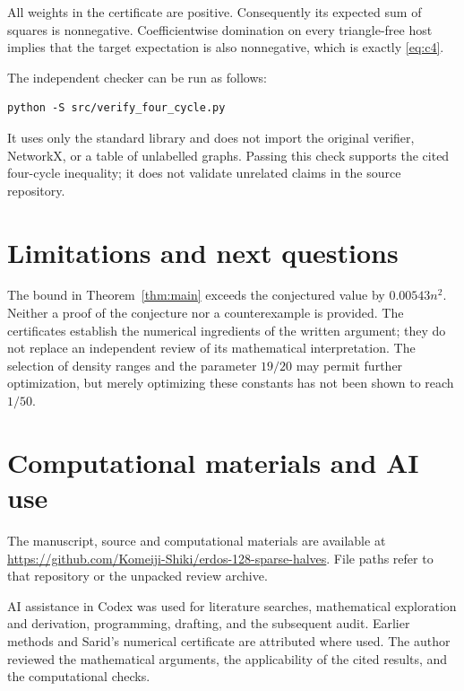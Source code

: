 \documentclass[12pt]{article}
\begin{document}
All weights in the certificate are positive. Consequently its expected
sum of squares is nonnegative. Coefficientwise domination on every
triangle-free host implies that the target expectation is also
nonnegative, which is exactly \eqref{eq:c4}.

The independent checker can be run as follows:
\begin{lstlisting}
python -S src/verify_four_cycle.py
\end{lstlisting}
It uses only the standard library and does not import the original
verifier, NetworkX, or a table of unlabelled graphs. Passing this check
supports the cited four-cycle inequality; it does not validate unrelated
claims in the source repository.

\section{Limitations and next questions}
The bound in Theorem~\ref{thm:main} exceeds the conjectured value by
$0.00543n^2$. Neither a proof of the conjecture nor a counterexample is
provided. The certificates establish the numerical ingredients of the
written argument; they do not replace an independent review of its
mathematical interpretation. The selection of density ranges and the
parameter $19/20$ may permit further optimization, but merely optimizing
these constants has not been shown to reach $1/50$.

\section*{Computational materials and AI use}
The manuscript, source and computational materials are available at
\url{https://github.com/Komeiji-Shiki/erdos-128-sparse-halves}.
File paths refer to that repository or the unpacked review archive.

AI assistance in Codex was used for literature searches, mathematical
exploration and derivation, programming, drafting, and the subsequent
audit. Earlier methods and Sarid's numerical certificate are attributed
where used. The author reviewed the mathematical arguments, the
applicability of the cited results, and the computational checks.
\end{document}
